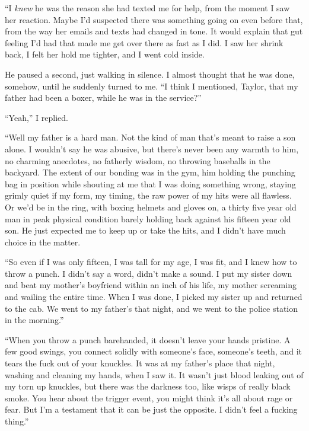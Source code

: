 ``I \emph{knew} he was the reason she had texted me for help, from the moment I saw her reaction.  Maybe I'd suspected there was something going on even before that, from the way her emails and texts had changed in tone.  It would explain that gut feeling I'd had that made me get over there as fast as I did.  I saw her shrink back, I felt her hold me tighter, and I went cold inside.



He paused a second, just walking in silence.  I almost thought that he was done, somehow, until he suddenly turned to me.  ``I think I mentioned, Taylor, that my father had been a boxer, while he was in the service?''



``Yeah,'' I replied.



``Well my father is a hard man.  Not the kind of man that's meant to raise a son alone.  I wouldn't say he was abusive, but there's never been any warmth to him, no charming anecdotes, no fatherly wisdom, no throwing baseballs in the backyard.  The extent of our bonding was in the gym, him holding the punching bag in position while shouting at me that I was doing something wrong, staying grimly quiet if my form, my timing, the raw power of my hits were all flawless.  Or we'd be in the ring, with boxing helmets and gloves on, a thirty five year old man in peak physical condition barely holding back against his fifteen year old son.  He just expected me to keep up or take the hits, and I didn't have much choice in the matter.



``So even if I was only fifteen, I was tall for my age, I was fit, and I knew how to throw a punch.  I didn't say a word, didn't make a sound.  I put my sister down and beat my mother's boyfriend within an inch of his life, my mother screaming and wailing the entire time.  When I was done, I picked my sister up and returned to the cab.  We went to my father's that night, and we went to the police station in the morning.''



``When you throw a punch barehanded, it doesn't leave your hands pristine.  A few good swings, you connect solidly with someone's face, someone's teeth, and it tears the fuck out of your knuckles.  It was at my father's place that night, washing and cleaning my hands, when I saw it.  It wasn't just blood leaking out of my torn up knuckles, but there was the darkness too, like wisps of really black smoke.  You hear about the trigger event, you might think it's all about rage or fear.  But I'm a testament that it can be just the opposite.  I didn't feel a fucking thing.''



